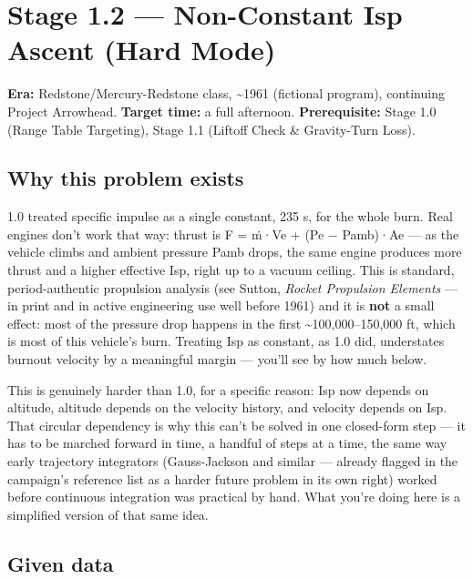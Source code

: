\documentclass[
  10pt,
]{article}
\author{}
\date{}
\begin{document}
\hypertarget{stage-1.2-non-constant-isp-ascent-hard-mode}{%
\section{Stage 1.2 --- Non-Constant Isp Ascent (Hard
Mode)}\label{stage-1.2-non-constant-isp-ascent-hard-mode}}

\textbf{Era:} Redstone/Mercury-Redstone class, \textasciitilde1961
(fictional program), continuing Project Arrowhead. \textbf{Target time:}
a full afternoon. \textbf{Prerequisite:} Stage 1.0 (Range Table
Targeting), Stage 1.1 (Liftoff Check \& Gravity-Turn Loss).

\hypertarget{why-this-problem-exists}{%
\subsection{Why this problem exists}\label{why-this-problem-exists}}

1.0 treated specific impulse as a single constant, 235 s, for the whole
burn. Real engines don't work that way: thrust is F = ṁ·Ve + (Pe −
Pamb)·Ae --- as the vehicle climbs and ambient pressure Pamb drops, the
same engine produces more thrust and a higher effective Isp, right up to
a vacuum ceiling. This is standard, period-authentic propulsion analysis
(see Sutton, \emph{Rocket Propulsion Elements} --- in print and in
active engineering use well before 1961) and it is \textbf{not} a small
effect: most of the pressure drop happens in the first
\textasciitilde100,000--150,000 ft, which is most of this vehicle's
burn. Treating Isp as constant, as 1.0 did, understates burnout velocity
by a meaningful margin --- you'll see by how much below.

This is genuinely harder than 1.0, for a specific reason: Isp now
depends on altitude, altitude depends on the velocity history, and
velocity depends on Isp. That circular dependency is why this can't be
solved in one closed-form step --- it has to be marched forward in time,
a handful of steps at a time, the same way early trajectory integrators
(Gauss-Jackson and similar --- already flagged in the campaign's
reference list as a harder future problem in its own right) worked
before continuous integration was practical by hand. What you're doing
here is a simplified version of that same idea.

\hypertarget{given-data}{%
\subsection{Given data}\label{given-data}}
\end{document}
